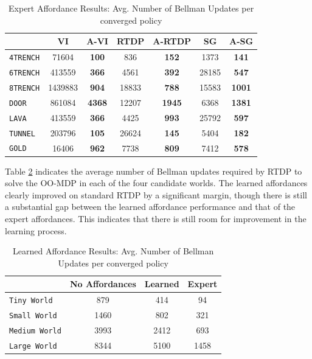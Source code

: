\documentclass[conference]{IEEEtran}
\begin{document}
\begin{table}
\centering
\caption{Expert Affordance Results: Avg. Number of Bellman Updates per converged policy}
\begin{tabular}{ l || c c | c c | c  c }
  & VI & A-VI & RTDP & A-RTDP & SG & A-SG \\ \hline
  \texttt{4TRENCH} 		&	71604 		& 	{\bf 100} 		& 	836 		& 	{\bf 152} 		&	1373 	& 	{\bf 141}  			\\
  \texttt{6TRENCH} 		&	413559 	 	& 	{\bf 366}  		& 	4561 	& 	{\bf 392} 		&	28185 	& 	{\bf 547}  \\
  \texttt{8TRENCH} 		&	1439883 		& 	{\bf 904}		& 	18833	& 	{\bf 788}		&	15583	& 	{\bf 1001} 			\\
  \texttt{DOOR} 		&	861084 	 	& 	{\bf 4368}		& 	12207	& 	{\bf 1945}		&	6368		& 	{\bf 1381}	\\
  \texttt{LAVA}  		&	413559 		& 	{\bf 366}	 	& 	4425 	& 	{\bf 993}  		&	25792	& 	{\bf 597}   \\
  \texttt{TUNNEL}  		&	203796 		& 	{\bf 105}		& 	26624	& 	{\bf 145}  		&	5404 	& 	{\bf 182}	\\
  \texttt{GOLD}  		&	16406		& 	{\bf 962}		& 	7738 	& 	{\bf 809}  		&	7412 	& 	{\bf 578}
\end{tabular}
\label{table:hard-results}
\end{table}

Table \ref{table:learned-results} indicates the average number of Bellman updates required by RTDP to solve the OO-MDP
in each of the four candidate worlds. The learned affordances clearly improved on standard RTDP by a significant margin, though
there is still a substantial gap between the learned affordance performance and that of the expert affordances. This indicates that
there is still room for improvement in the learning process.
\begin{table}
\centering
\caption{Learned Affordance Results: Avg. Number of Bellman Updates per converged policy}
\begin{tabular}{ l || c c c }
  & No Affordances & Learned & Expert  \\ \hline
  \texttt{Tiny World}  		& 	879		&	414	&	 94	\\
  \texttt{Small World}  	& 	1460		&	802	&	321  \\
  \texttt{Medium World}  	& 	3993		&	2412	&	693  \\
  \texttt{Large World}  	& 	8344		&	5100	&	1458
\end{tabular}
\label{table:learned-results}
\end{table}
\end{document}

